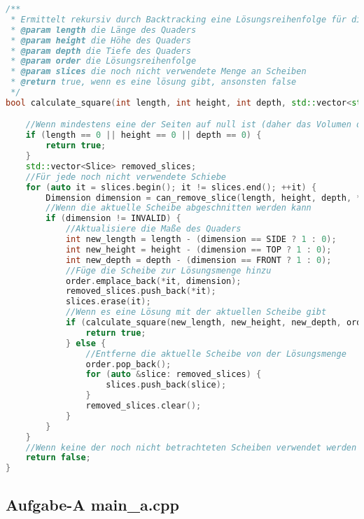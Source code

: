 \documentclass[a4paper,10pt,ngerman]{scrartcl}
\begin{document}
    \begin{lstlisting}[frame=single,language=C++,title=Methode calculate\_square,breaklines=true,label={lst:code_calculateSquare}]
/**
 * Ermittelt rekursiv durch Backtracking eine Lösungsreihenfolge für die gegebene Menge an Scheiben.
 * @param length die Länge des Quaders
 * @param height die Höhe des Quaders
 * @param depth die Tiefe des Quaders
 * @param order die Lösungsreihenfolge
 * @param slices die noch nicht verwendete Menge an Scheiben
 * @return true, wenn es eine lösung gibt, ansonsten false
 */
bool calculate_square(int length, int height, int depth, std::vector<std::pair<Slice, Dimension>> &order, std::vector<Slice> &slices) {

    //Wenn mindestens eine der Seiten auf null ist (daher das Volumen des Quaders null ist)
    if (length == 0 || height == 0 || depth == 0) {
        return true;
    }
    std::vector<Slice> removed_slices;
    //Für jede noch nicht verwendete Schiebe
    for (auto it = slices.begin(); it != slices.end(); ++it) {
        Dimension dimension = can_remove_slice(length, height, depth, *it);
        //Wenn die aktuelle Scheibe abgeschnitten werden kann
        if (dimension != INVALID) {
            //Aktualisiere die Maße des Quaders
            int new_length = length - (dimension == SIDE ? 1 : 0);
            int new_height = height - (dimension == TOP ? 1 : 0);
            int new_depth = depth - (dimension == FRONT ? 1 : 0);
            //Füge die Scheibe zur Lösungsmenge hinzu
            order.emplace_back(*it, dimension);
            removed_slices.push_back(*it);
            slices.erase(it);
            //Wenn es eine Lösung mit der aktuellen Scheibe gibt
            if (calculate_square(new_length, new_height, new_depth, order, slices)) {
                return true;
            } else {
                //Entferne die aktuelle Scheibe von der Lösungsmenge
                order.pop_back();
                for (auto &slice: removed_slices) {
                    slices.push_back(slice);
                }
                removed_slices.clear();
            }
        }
    }
    //Wenn keine der noch nicht betrachteten Scheiben verwendet werden kann
    return false;
}
    \end{lstlisting}

    \newpage

    \subsection{Aufgabe-A main\_a.cpp}\label{subsec:alles-kaese}
\end{document}
